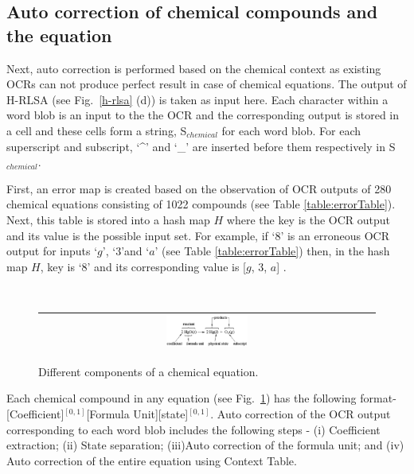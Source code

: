 \subsection{Auto correction of chemical compounds and the equation}

Next, auto correction is performed based on the chemical context as existing OCRs can not produce perfect result in case of chemical equations.  The output of H-RLSA  (see Fig.~\ref{h-rlsa} (d)) is taken as input here. 
Each character within a word blob is an input to the the OCR and the corresponding output  is stored in a cell and these cells form a string, S$_{chemical}$ for each word blob. For each superscript and subscript, `\^{}'  and  `\_' are inserted before them respectively in S$_{chemical}$.

 First, an error map is created based on the observation of OCR outputs of 280 chemical equations consisting of 1022 compounds (see Table \ref{table:errorTable}). Next, this table is stored into a hash map $H$ where the key is the OCR output and its value is the possible input set.
For example, if `$8$' is an erroneous OCR output for inputs `$g$', `$3$'and `$a$' (see Table \ref{table:errorTable}) then, in the hash map $H$, key is `$8$' and its corresponding value is [$g$, $3$, $a$] .

\begin{figure}[h]
\center\ 
\begin{tabular}{|c|} 
\hline
\includegraphics[width=0.25\textwidth]{chemEqParts.png}\\
\hline
\end{tabular} 
\caption{Different components of a chemical equation. }
\label{chemEqParts} 
\end{figure}  

 Each chemical compound in any equation (see Fig.~\ref{chemEqParts}) has the following format- [Coefficient]$^{[0,1]}$[Formula Unit][state]$^{[0,1]}$. Auto correction of the OCR output corresponding to each word blob includes the following steps - (i) Coefficient extraction; (ii) State separation; (iii)Auto correction of the formula unit; and (iv) Auto correction of the entire equation using Context Table.


